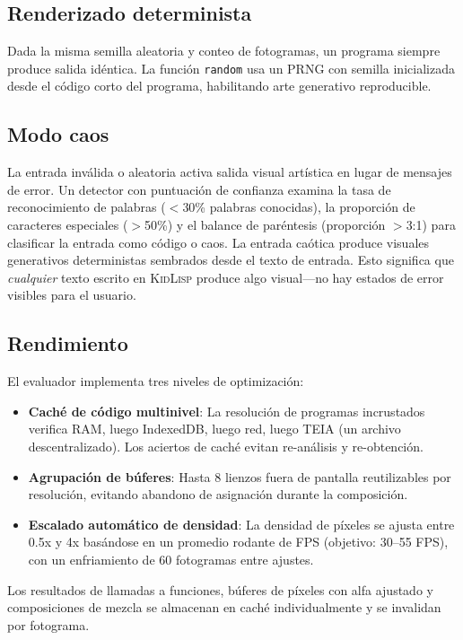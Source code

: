 \documentclass[10pt,letterpaper,twocolumn]{article}
\newcommand{\kidlisp}{\textsc{KidLisp}}
\begin{document}
\subsection{Renderizado determinista}

Dada la misma semilla aleatoria y conteo de fotogramas, un programa siempre produce salida idéntica. La función \texttt{random} usa un PRNG con semilla inicializada desde el código corto del programa, habilitando arte generativo reproducible.

\subsection{Modo caos}

La entrada inválida o aleatoria activa salida visual artística en lugar de mensajes de error. Un detector con puntuación de confianza examina la tasa de reconocimiento de palabras ($<$30\% palabras conocidas), la proporción de caracteres especiales ($>$50\%) y el balance de paréntesis (proporción $>$3:1) para clasificar la entrada como código o caos. La entrada caótica produce visuales generativos deterministas sembrados desde el texto de entrada. Esto significa que \emph{cualquier} texto escrito en \kidlisp{} produce algo visual---no hay estados de error visibles para el usuario.

\subsection{Rendimiento}

El evaluador implementa tres niveles de optimización:

\begin{itemize}
  \item \textbf{Caché de código multinivel}: La resolución de programas incrustados verifica RAM, luego IndexedDB, luego red, luego TEIA (un archivo descentralizado). Los aciertos de caché evitan re-análisis y re-obtención.
  \item \textbf{Agrupación de búferes}: Hasta 8 lienzos fuera de pantalla reutilizables por resolución, evitando abandono de asignación durante la composición.
  \item \textbf{Escalado automático de densidad}: La densidad de píxeles se ajusta entre 0.5x y 4x basándose en un promedio rodante de FPS (objetivo: 30--55 FPS), con un enfriamiento de 60 fotogramas entre ajustes.
\end{itemize}

Los resultados de llamadas a funciones, búferes de píxeles con alfa ajustado y composiciones de mezcla se almacenan en caché individualmente y se invalidan por fotograma.
\end{document}

